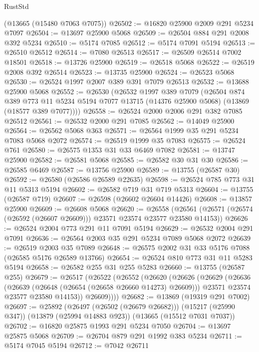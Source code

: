 \begin{lexlean}{RustStd}
\begin{coremodule}
    (@13665 (@15480 @7063 @7075))
@26502 := @16820 @25900 @2009 @291 @5234 @7097
@26504 := @13697 @25900 @5068
@26509 := @26504 @884 @291 @2008 @392 @5234
@26510 := @5174 @7085
@26512 := @5174 @7091 @5194
@26513 := @26510 @26512
@26514 := @7080 @26513
@26517 := @26509 @26514 @7002 @18501
@26518 := @13726 @25900
@26519 := @26518 @5068
@26522 := @26519 @2008 @392 @26514
@26523 := @13735 @25900
@26524 := @26523 @5068
@26530 := @26524 @1997 @2007 @389 @391 @7079 @26513
@26532 := @13688 @25900 @5068
@26552 := @26530
    (@26532
      @1997
      @389
      @7079
      (@26504
        @874
        @389
        @773
        @11
        @5234
        @5194
        @7077
        @13715
        (@14376 @25900 @5068)
        (@13869 (@18577 @389 @7077))))
@26558 := @26524 @2000 @2006 @291 @382 @7085 @26512
@26561 := @26532 @2000 @291 @7085
@26562 := @14049 @25900
@26564 := @26562 @5068 @363
@26571 := @26564 @1999 @35 @291 @5234 @7083 @5068 @2072
@26574 := @26519 @1999 @35 @7083
@26575 := @26524 @761
@26580 := @26575 @1353 @31 @33 @6469 @7082
@26581 := @13747 @25900
@26582 := @26581 @5068
@26585 := @26582 @30 @31 @30
@26586 := @26585 @6469
@26587 := @13756 @25900
@26589 := @13755 (@26587 @30)
@26592 := @26580 (@26586 @26589 @22635)
@26598 := @26524 @785 @773 @31 @11 @5313 @5194
@26602 := @26582 @719 @31 @719 @5313
@26604 := @13755 (@26587 @719)
@26607 := @26598 (@26602 @26604 @14426)
@26608 := @13857 @25900
@26609 := @26608 @5068
@26620 := @26558
    (@26561 (@26571 (@26574 (@26592 (@26607 @26609))) @23571 @23574 @23577 @23580 @14153))
@26626 := @26524 @2004 @773 @291 @11 @7091 @5194
@26629 := @26532 @2004 @291 @7091
@26636 := @26564 @2003 @35 @291 @5234 @7089 @5068 @2072
@26639 := @26519 @2003 @35 @7089
@26648 := @26575 @2002 @31 @33 @5176 @7088 (@26585 @5176 @26589 @13766)
@26654 := @26524 @810 @773 @31 @11 @5283 @5194
@26658 := @26582 @255 @31 @255 @5283
@26660 := @13755 (@26587 @255)
@26679 := @26517
    (@26522
      (@26552
        (@26620
          (@26626
            (@26629
              (@26636
                (@26639 (@26648 (@26654 (@26658 @26660 @14273) @26609)))
                @23571
                @23574
                @23577
                @23580
                @14153))
            @26609))))
@26682 := @13869 (@19319 @291 @7002)
@26697 := @25892
    (@26497 (@26502 (@26679 @26682)))
    (@15217 (@25990 @347))
    (@13879 (@25994 @14883 @923))
    (@13665 (@15512 @7031 @7037))
@26702 := @16820 @25875 @1993 @291 @5234 @7050
@26704 := @13697 @25875 @5068
@26709 := @26704 @879 @291 @1992 @383 @5234
@26711 := @5174 @7045 @5194
@26712 := @7042 @26711

\end{coremodule}
\end{lexlean}
